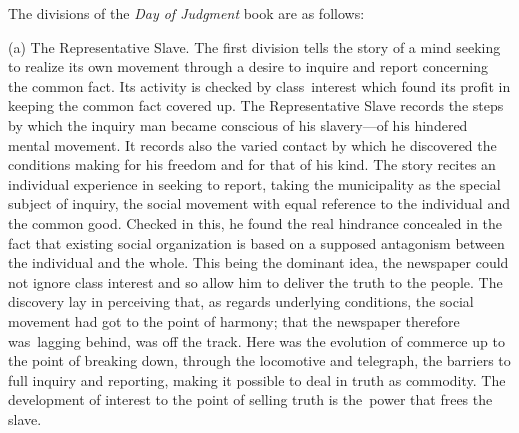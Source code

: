 \documentclass[openany,nobib]{tufte-book}
\begin{document}
The divisions of the \emph{Day of Judgment} book are as follows:~

\vspace{.1in}

\begin{hangparas}{.25in}{1} 

(a) The Representative Slave. The first division tells the story of a
mind seeking to realize its own movement through a desire to inquire and
report concerning the common fact. Its activity is checked by
class~interest which found its profit in keeping the common fact covered
up. The Representative Slave records the steps by which the inquiry man
became conscious of his slavery---of his hindered mental movement. It
records also the varied contact by which he discovered the conditions
making for his freedom and for that of his kind. The story recites an
individual experience in seeking to report, taking the municipality as
the special subject of inquiry, the social movement with equal reference
to the individual and the common good. Checked in this, he found the
real hindrance concealed in the fact that existing social organization
is based on a supposed antagonism between the individual and the whole.
This being the dominant idea, the newspaper could not ignore class
interest and so allow him to deliver the truth to the people. The
discovery lay in perceiving that, as regards underlying conditions, the
social movement had got to the point of harmony; that the newspaper
therefore was~lagging behind, was off the track. Here was the evolution
of commerce up to the point of breaking down, through the locomotive and
telegraph, the barriers to full inquiry and reporting, making it
possible to deal in truth as commodity. The development of interest to
the point of selling truth is the~power that frees the slave.~




\end{hangparas}
\end{document}
